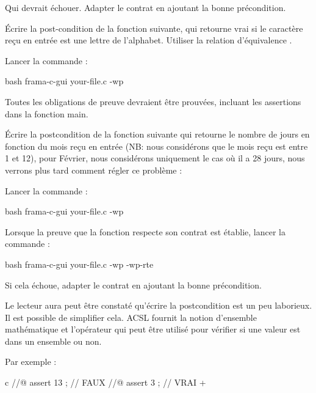 Qui devrait échouer. Adapter le contrat en ajoutant la bonne précondition.




Écrire la post-condition de la fonction suivante, qui retourne vrai si le
caractère reçu en entrée est une lettre de l'alphabet. Utiliser la relation
d'équivalence  \CodeInline{<==>}.




Lancer la commande :


\begin{CodeBlock}{bash}
frama-c-gui your-file.c -wp
\end{CodeBlock}


Toutes les obligations de preuve devraient être prouvées, incluant les
assertions dans la fonction main.




Écrire la postcondition de la fonction suivante qui retourne le nombre de
jours en fonction du mois reçu en entrée (NB: nous considérons que le mois
reçu est entre 1 et 12), pour Février, nous considérons uniquement le cas
où il a 28 jours, nous verrons plus tard comment régler ce problème :




Lancer la commande :


\begin{CodeBlock}{bash}
frama-c-gui your-file.c -wp
\end{CodeBlock}


Lorsque la preuve que la fonction respecte son contrat est établie, lancer
la commande :

\begin{CodeBlock}{bash}
frama-c-gui your-file.c -wp -wp-rte
\end{CodeBlock}


Si cela échoue, adapter le contrat en ajoutant la bonne précondition.


Le lecteur aura peut être constaté qu'écrire la postcondition est un peu
laborieux. Il est possible de simplifier cela. ACSL fournit la notion
d'ensemble mathématique et l'opérateur  qui
peut être utilisé pour vérifier si une valeur est dans un ensemble ou non.


Par exemple :

\begin{CodeBlock}{c}
//@ assert 13  ; // FAUX
//@ assert 3   ; // VRAI
+\end{CodeBlock}



